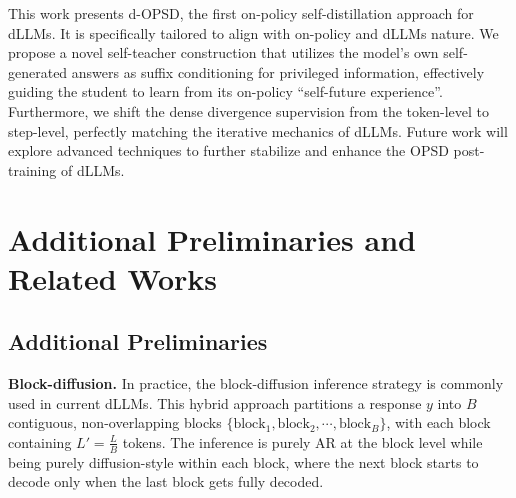 \documentclass{article}
\begin{document}
This work presents d-OPSD, the first on-policy self-distillation approach for dLLMs. It is specifically tailored to align with on-policy and dLLMs nature. We propose a novel self-teacher construction that utilizes the model's own self-generated answers as suffix conditioning for privileged information, effectively guiding the student to learn from its on-policy ``self-future experience''. Furthermore, we shift the dense divergence supervision from the token-level to step-level, perfectly matching the iterative mechanics of dLLMs. Future work will explore advanced techniques to further stabilize and enhance the OPSD post-training of dLLMs.














\newpage
\appendix


\section{Additional Preliminaries and Related Works}


\subsection{Additional Preliminaries} \label{app1.1}


\textbf{Block-diffusion. } In practice, the block-diffusion inference strategy \citep{han2023ssd, arriola2025block, fathi2025unifying} is commonly used in current dLLMs. This hybrid approach partitions a response $y$ into $B$ contiguous, non-overlapping blocks $\{\text{block}_1, \text{block}_2, \cdots, \text{block}_B\}$, with each block containing $L' = \frac{L}{B}$ tokens. The inference is purely AR at the block level while being purely diffusion-style within each block, where the next block starts to decode only when the last block gets fully decoded.
\end{document}
